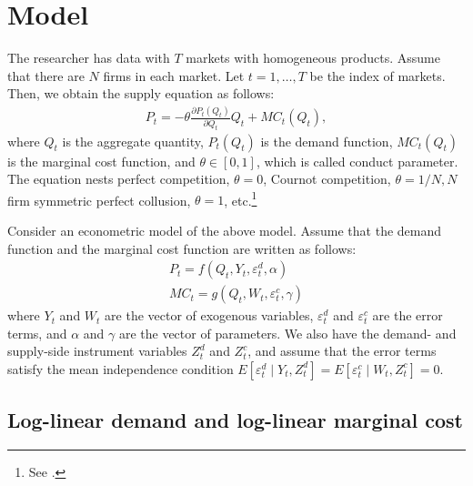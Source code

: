 \documentclass[11pt, a4paper]{article}
\begin{document}
\section{Model}
The researcher has data with $T$ markets with homogeneous products.
Assume that there are $N$ firms in each market.
Let $t = 1,\ldots, T$ be the index of markets.
Then, we obtain the supply equation as follows:
\begin{align}
     P_t = -\theta\frac{\partial P_t(Q_{t})}{\partial Q_{t}}Q_{t} + MC_t(Q_{t}),\label{eq:supply_equation}
\end{align}
where $Q_{t}$ is the aggregate quantity, $P_t(Q_{t})$ is the demand function, $MC_{t}(Q_{t})$ is the marginal cost function, and $\theta\in[0,1]$, which is called conduct parameter. 
The equation nests perfect competition, $\theta=0$, Cournot competition, $\theta=1/N, N$ firm symmetric perfect collusion, $\theta=1$, etc.\footnote{See \cite{bresnahan1982oligopoly}.} 

Consider an econometric model of the above model.
Assume that the demand function and the marginal cost function are written as follows: 
\begin{align}
    P_t = f(Q_{t}, Y_t, \varepsilon^{d}_{t}, \alpha) \label{eq:demand}\\
    MC_t = g(Q_{t}, W_{t}, \varepsilon^{c}_{t}, \gamma)\label{eq:marginal_cost}
\end{align}
where $Y_t$ and $W_{t}$ are the vector of exogenous variables, $\varepsilon^{d}_{t}$ and $\varepsilon^{c}_{t}$ are the error terms, and $\alpha$ and $\gamma$ are the vector of parameters.
We also have the demand- and supply-side instrument variables $Z^{d}_{t}$ and $Z^{c}_{t}$, and assume that the error terms satisfy the mean independence condition $E[\varepsilon^{d}_{t}\mid Y_t, Z^{d}_{t}] = E[\varepsilon^{c}_{t} \mid W_{t}, Z^{c}_{t}] =0$.

\subsection{Log-linear demand and log-linear marginal cost}
\end{document}
